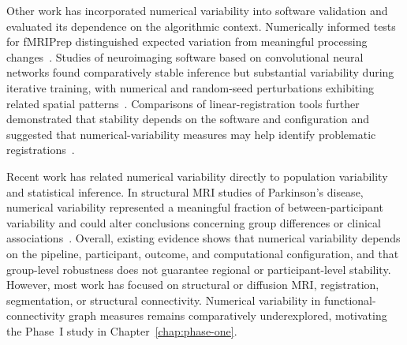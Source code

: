 Other work has incorporated numerical variability into software validation and evaluated its dependence on the algorithmic context. Numerically informed tests for fMRIPrep distinguished expected variation from meaningful processing changes~\cite{chatelain2024numerical}. Studies of neuroimaging software based on convolutional neural networks found comparatively stable inference but substantial variability during iterative training, with numerical and random-seed perturbations exhibiting related spatial patterns~\cite{Gonzalez2023Inference,Gonzalez2025CNN}. Comparisons of linear-registration tools further demonstrated that stability depends on the software and configuration and suggested that numerical-variability measures may help identify problematic registrations~\cite{mirhakimi2025numerical}.

Recent work has related numerical variability directly to population variability and statistical inference. In structural MRI studies of Parkinson's disease, numerical variability represented a meaningful fraction of between-participant variability and could alter conclusions concerning group differences or clinical associations~\cite{Yohan2025NPVR}. Overall, existing evidence shows that numerical variability depends on the pipeline, participant, outcome, and computational configuration, and that group-level robustness does not guarantee regional or participant-level stability. However, most work has focused on structural or diffusion MRI, registration, segmentation, or structural connectivity. Numerical variability in functional-connectivity graph measures remains comparatively underexplored, motivating the Phase~I study in Chapter~\ref{chap:phase-one}.
